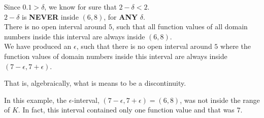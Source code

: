 \documentclass{ximera}
\begin{document}
\begin{example}
\begin{explanation}
\begin{image}
\end{image}



Since $0.1 > \delta$, we know for sure that $2 - \delta < 2$.  \\
$2 - \delta$ is \textbf{\textcolor{red!70!black}{NEVER}} inside $(6, 8)$, for \textbf{\textcolor{red!70!black}{ANY}} $\delta$.\\



There is no open interval around $5$, such that all function values of all domain numbers inside this interval are always inside $(6,8)$. \\




We have produced an $\epsilon$, such that there is no open interval around $5$ where the function values of domain numbers inside this interval are always inside $(7-\epsilon , 7+\epsilon)$.


That is, algebraically, what is means to be a discontinuity.



\end{explanation}
\end{example}


In this example, the $\epsilon$-interval, $(7-\epsilon, 7+\epsilon) = (6,8)$, was not inside the range of $K$.  In fact, this interval contained only one function value and that was $7$.
\end{document}
